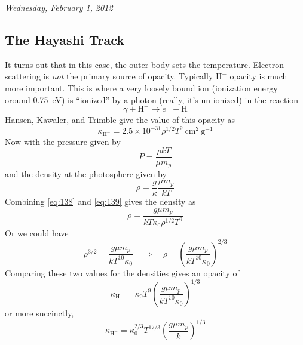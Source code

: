 \documentclass[10pt]{article}
\numberwithin{equation}{section}
\newcommand{\n}{\noindent}
\begin{document}
  \n\textit{Wednesday, February 1, 2012}
  \subsection{The Hayashi Track}
  \label{sec:fully-conv-stars}
  \n It turns out that in this case, the outer body sets the
  temperature. Electron scattering is \emph{not} the primary source of
  opacity. Typically $\mathrm{H^-}$ opacity is much more
  important. This is where a very loosely bound ion (ionization energy
  oround 0.75\ eV) is ``ionized'' by a photon (really, it's un-ionized)
  in the reaction
  \begin{equation}
    \label{eq:136}
    \gamma+\mathrm{H^-}\to e^{-}+\mathrm{H}
  \end{equation}
  Hansen, Kawaler, and Trimble give the value of this opacity as
  \begin{equation}
    \label{eq:137}
    \kappa_{\mathrm{H^-}}=2.5\times 10^{-31}\rho^{1/2} T^9\
    \mathrm{cm^2\ g^{-1}}
  \end{equation}
  Now with the pressure given by
  \begin{equation}
    \label{eq:138}
    P=\frac{\rho kT}{\mu m_p}
  \end{equation}
  and the density at the photosphere given by
  \begin{equation}
    \label{eq:139}
    \rho=\frac{g}{\kappa}\frac{\mu m_p}{kT}
  \end{equation}
  Combining \eqref{eq:138} and \eqref{eq:139} gives the density as
  \begin{equation}
    \label{eq:140}
    \rho=\frac{g\mu m_p}{kT \kappa_0 \rho^{1/2}T^9}
  \end{equation}
  Or we could have 
  \begin{equation}
    \label{eq:141}
    \rho^{3/2}=\frac{g\mu m_p}{kT^{10}\kappa_0}\quad\Rightarrow\quad
    \rho=\left(\frac{g\mu m_p}{kT^{10}\kappa_0}\right)^{2/3}
  \end{equation}
  Comparing these two values for the densities gives an opacity of
  \begin{equation}
    \label{eq:142}
    \kappa_{\mathrm{H^-}}=\kappa_0 T^9\left(\frac{g\mu m_p}{k T^{10}\kappa_0}\right)^{1/3}
  \end{equation}
  or more succinctly,
  \begin{equation}
    \label{eq:143}
    \boxed{
    \kappa_{\mathrm{H^-}}=\kappa_0^{2/3}T^{17/3}\left(\frac{g\mu m_p}{k}\right)^{1/3}}
  \end{equation}
\end{document}
